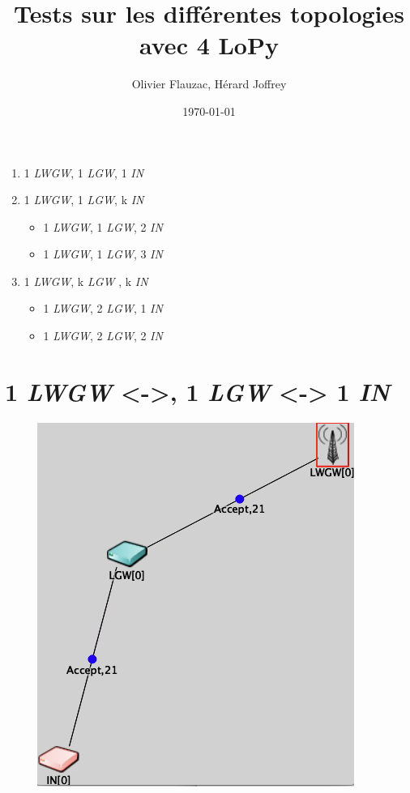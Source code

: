 \documentclass[a4paper]{article}
\title{Tests sur les différentes topologies avec 4 LoPy}
\author{Olivier Flauzac, Hérard Joffrey}
\date{\today}
\begin{document}
\maketitle
\begin{enumerate}
\item 1 \textit{LWGW}, 1 \textit{LGW}, 1 \textit{IN} 

\item 1 \textit{LWGW}, 1 \textit{LGW}, k \textit{IN}  
	\begin{itemize}
		\item  1 \textit{LWGW}, 1 \textit{LGW}, 2 \textit{IN}  
		\item  1 \textit{LWGW}, 1 \textit{LGW}, 3 \textit{IN}  
	\end{itemize}

\item 1 \textit{LWGW}, k \textit{LGW} , k \textit{IN}  
	\begin{itemize}
		\item  1 \textit{LWGW}, 2 \textit{LGW}, 1 \textit{IN}  
		\item  1 \textit{LWGW}, 2 \textit{LGW}, 2 \textit{IN}  
	\end{itemize}
\end{enumerate}

\newpage
\section{ 1 \textit{LWGW} <->, 1 \textit{LGW} <-> 1 \textit{IN} }
\begin{figure}[h!]
\centering
\includegraphics[scale=0.5]{../Rapport_PFE/chaine.png} 
\end{figure}
\newpage
\end{document}
